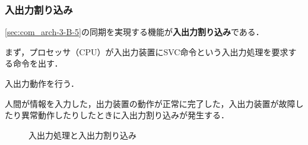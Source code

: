 \subsubsection{入出力割り込み}\label{sec:com_arch-3-B-6}

\ref{sec:com_arch-3-B-5}の同期を実現する機能が\textbf{入出力割り込み}である．

\begin{enumerate}[label=\textbf{[\arabic*]}, labelsep=10pt, leftmargin=23pt]
	\item まず，プロセッサ（CPU）が入出力装置にSVC命令という入出力処理を要求する命令を出す．
	\item 入出力動作を行う．
	\item 人間が情報を入力した，出力装置の動作が正常に完了した，入出力装置が故障したり異常動作したりしたときに入出力割り込みが発生する．
\end{enumerate}

\begin{figure}[H]
	\begin{center}
		\caption{入出力処理と入出力割り込み}
		\label{fig:com_arch-12}
	\end{center}
\end{figure}
